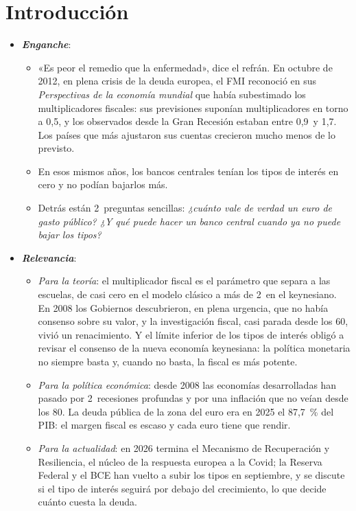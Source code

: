 \documentclass[11pt]{article}
\begin{document}
\tceetitulo

\section*{Introducción}

\begin{itemize}
\item \textbf{\emph{Enganche}}:
  \begin{itemize}
  \item «Es peor el remedio que la enfermedad», dice el refrán. En octubre de 2012, en plena crisis de la deuda europea, el FMI reconoció en sus \emph{Perspectivas de la economía mundial} que había subestimado los multiplicadores fiscales: sus previsiones suponían multiplicadores en torno a 0,5, y los observados desde la Gran Recesión estaban entre 0,9~y 1,7\nocite{FMI2012WEOoct}. Los países que más ajustaron sus cuentas crecieron mucho menos de lo previsto\nocite{BlanchardLeigh2013Growth}.
  \item En esos mismos años, los bancos centrales tenían los tipos de interés en cero y no podían bajarlos más.
  \item Detrás están 2~preguntas sencillas: \emph{¿cuánto vale de verdad un euro de gasto público? ¿Y qué puede hacer un banco central cuando ya no puede bajar los tipos?}
  \end{itemize}

\item \textbf{\emph{Relevancia}}:
  \begin{itemize}
  \item \emph{Para la teoría}: el multiplicador fiscal es el parámetro que separa a las escuelas, de casi cero en el modelo clásico a más de 2~en el keynesiano. En 2008 los Gobiernos descubrieron, en plena urgencia, que no había consenso sobre su valor, y la investigación fiscal, casi parada desde los 60, vivió un renacimiento\nocite{Ramey2019Ten}. Y el límite inferior de los tipos de interés obligó a revisar el consenso de la nueva economía keynesiana: la política monetaria no siempre basta y, cuando no basta, la fiscal es más potente.
  \item \emph{Para la política económica}: desde 2008 las economías desarrolladas han pasado por 2~recesiones profundas y por una inflación que no veían desde los 80. La deuda pública de la zona del euro era en 2025 el 87,7~\% del PIB\nocite{Eurostat2026EDP}: el margen fiscal es escaso y cada euro tiene que rendir.
  \item \emph{Para la actualidad}: en 2026 termina el Mecanismo de Recuperación y Resiliencia, el núcleo de la respuesta europea a la Covid\nocite{UE2021Reglamento241}; la Reserva Federal y el BCE han vuelto a subir los tipos en septiembre\nocite{FedNY2026EFFR,BCE2026Tipos}, y se discute si el tipo de interés seguirá por debajo del crecimiento, lo que decide cuánto cuesta la deuda.
  \end{itemize}


\end{itemize}
\end{document}
